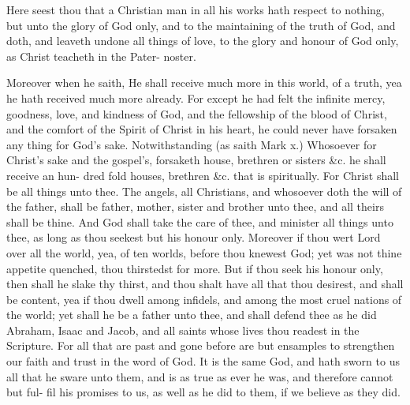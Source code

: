 \documentclass{custom}
\begin{document}
Here seest thou that a Christian man in all his works 
hath respect to nothing, but unto the glory of God only, 
and to the maintaining of the truth of God, and doth, 
and leaveth undone all things of love, to the glory and 
honour of God only, as Christ teacheth in the Pater- 
noster. 

Moreover when he saith, He shall receive much more 
in this world, of a truth, yea he hath received much more 
already. For except he had felt the infinite mercy, 
goodness, love, and kindness of God, and the fellowship 
of the blood of Christ, and the comfort of the Spirit of 
Christ in his heart, he could never have forsaken any thing 
for God's sake. Notwithstanding (as saith Mark x.) 
Whosoever for Christ's sake and the gospel's, forsaketh 
house, brethren or sisters \&c. he shall receive an hun- 
dred fold houses, brethren \&c. that is spiritually. For 
Christ shall be all things unto thee. The angels, all 
Christians, and whosoever doth the will of the father, 
shall be father, mother, sister and brother unto thee, and 
all theirs shall be thine. And God shall take the care of 
thee, and minister all things unto thee, as long as thou 
seekest but his honour only. Moreover if thou wert 
Lord over all the world, yea, of ten worlds, before thou 
knewest God; yet was not thine appetite quenched, thou 
thirstedst for more. But if thou seek his honour only, 
then shall he slake thy thirst, and thou shalt have all that 
thou desirest, and shall be content, yea if thou dwell 
among infidels, and among the most cruel nations of 
the world; yet shall he be a father unto thee, and shall 
defend thee as he did Abraham, Isaac and Jacob, and all 
saints whose lives thou readest in the Scripture. For all 
that are past and gone before are but ensamples to strengthen 
our faith and trust in the word of God. It is the same 
God, and hath sworn to us all that he sware unto them, 
and is as true as ever he was, and therefore cannot but ful- 
fil his promises to us, as well as he did to them, if we 
believe as they did. 
\end{document}
